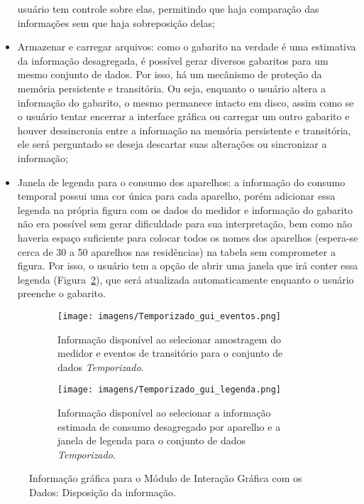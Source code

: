 \begin{itemize}
usuário tem controle sobre elas, permitindo que haja comparação das
informações sem que haja sobreposição delas;
\item Armazenar e carregar arquivos: como o gabarito na verdade é uma
estimativa da informação desagregada, é possível gerar diversos
gabaritos para um mesmo conjunto de dados. Por isso, há um mecânismo de
proteção da memória persistente e transitória. Ou seja, enquanto o
usuário altera a informação do gabarito, o mesmo permanece intacto em
disco, assim como se o usuário tentar encerrar a interface gráfica ou
carregar um outro gabarito e houver dessincronia entre a informação
na memória persistente e transitória, ele será perguntado se deseja
descartar suas alterações ou sincronizar a informação;
\item Janela de legenda para o consumo dos aparelhos: a informação do
consumo temporal possui uma cor única para cada aparelho, porém
adicionar essa legenda na própria figura com os dados do medidor e
informação do gabarito não era possível sem gerar dificuldade para sua
interpretação, bem como não haveria espaço suficiente para colocar
todos os nomes dos aparelhos (espera-se cerca de 30 a 50 aparelhos nas
residências) na tabela sem comprometer a figura. Por isso, o usuário
tem a opção de abrir uma janela que irá conter essa legenda
(Figura~\ref{fig:temporizado_gui_legenda}), que será atualizada
automaticamente enquanto o usuário preenche o gabarito.
\end{itemize}

\begin{figure*}[p!]
  \begin{center}
    \begin{subfigure}[c]{\textwidth}
      \texttt{[image: imagens/Temporizado\_gui\_eventos.png]}
      \caption{Informação disponível ao selecionar amostragem do
medidor e eventos de transitório para o conjunto de dados \emph{Temporizado}.}
      \label{fig:temporizado_gui_eventos}
    \end{subfigure}
    \hfill
    \begin{subfigure}[c]{\textwidth}
      \texttt{[image: imagens/Temporizado\_gui\_legenda.png]}
      \caption{Informação disponível ao selecionar a informação
estimada de consumo desagregado por aparelho e a janela de legenda
para o conjunto de dados \emph{Temporizado}.}
      \label{fig:temporizado_gui_legenda}
    \end{subfigure}
  \end{center}
\caption{Informação gráfica para o Módulo de Interação Gráfica com os
Dados: Disposição da informação.}
\label{fig:gui_informacao} \end{figure*}



